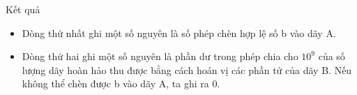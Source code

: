 Kết quả  
\begin{itemize}
	\item     Dòng thứ nhất ghi một số nguyên là số phép chèn hợp lệ số b vào dãy A.   
	\item     Dòng thứ hai ghi một số nguyên là phần dư trong phép chia cho $10^{9}$    của số lượng dãy hoàn hảo thu được bằng cách hoán vị các phần tử của dãy B. Nếu không thể chèn được b vào dãy A, ta ghi ra 0.   
\end{itemize}